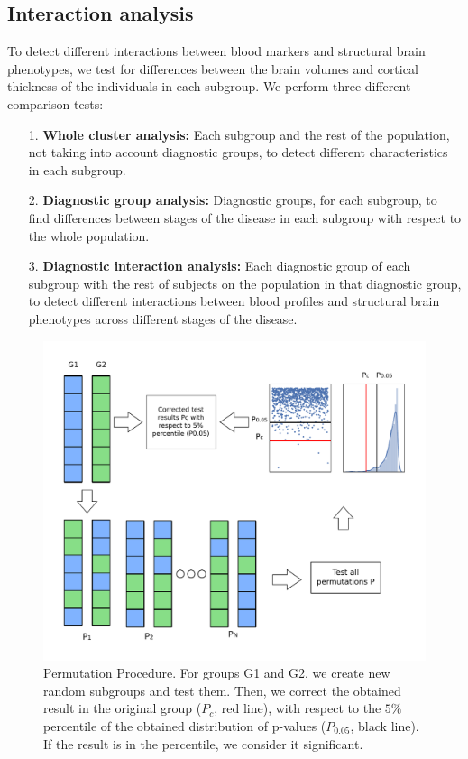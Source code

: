 \subsection{Interaction analysis}

To detect different interactions between blood markers and structural brain phenotypes, we test for differences between the brain volumes and cortical thickness of the individuals in each subgroup. We perform three different comparison tests:

\begin{itemize}
\item[1.] \textbf{Whole cluster analysis:} Each subgroup and the rest of the population, not taking into account diagnostic groups, to detect different characteristics in each subgroup.
\item[2.] \textbf{ Diagnostic group analysis:} Diagnostic groups, for each subgroup, to find differences between stages of the disease in each subgroup with respect to the whole population. %
\item[3.] \textbf{Diagnostic interaction analysis:} Each diagnostic group of each subgroup with the rest of subjects on the population in that diagnostic group, to detect different interactions between blood profiles and structural brain phenotypes across different stages of the disease.
\end{itemize}

\begin{figure}[!htbp]
\centering
\includegraphics[width=1.0\textwidth]{figures/cimlr/figure_2.pdf}
    \caption[Permutation procedure.]{Permutation Procedure. For groups G1 and G2, we create new random subgroups and test them. Then, we correct the obtained result in the original group ($P_c$, red line), with respect to the $5\%$ percentile of the obtained distribution of p-values ($P_{0.05}$, black line). If the result is in the percentile, we consider it significant.}
    \label{fig:permutation}
\end{figure}

